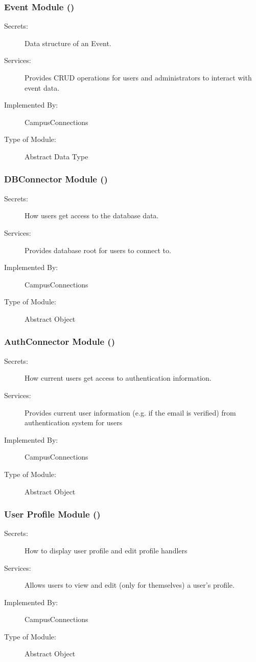 \documentclass[12pt, titlepage]{article}
\begin{document}
  \subsubsection{Event Module (\label{mEvent})}
  \begin{description}
    \item[Secrets:]Data structure of an Event.
    \item[Services:]Provides CRUD operations for users and administrators to interact with event data.
    \item[Implemented By:] CampusConnections
    \item[Type of Module:] Abstract Data Type
  \end{description}
  
  \subsubsection{DBConnector Module (\label{mDBConnector})}
  \begin{description}
    \item[Secrets:]How users get access to the database data.
    \item[Services:]Provides database root for users to connect to.
    \item[Implemented By:] CampusConnections
    \item[Type of Module:] Abstract Object
  \end{description}
  
  \subsubsection{AuthConnector Module (\label{mAuthConnector})}
  \begin{description}
    \item[Secrets:]How current users get access to authentication information.
    \item[Services:]Provides current user information (e.g. if the email is verified) from authentication system for users
    \item[Implemented By:] CampusConnections
    \item[Type of Module:] Abstract Object
  \end{description}
  
  \subsubsection{User Profile Module (\label{mUP})}
  \begin{description}
    \item[Secrets:]How to display user profile and edit profile handlers
    \item[Services:]Allows users to view and edit (only for themselves) a user's profile.
    \item[Implemented By:] CampusConnections
    \item[Type of Module:] Abstract Object
  \end{description}
  
\end{document}
